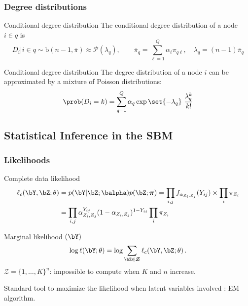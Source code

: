 \documentclass{beamer}\usepackage[]{graphicx}\usepackage[]{color}
\begin{document}
\begin{frame}
  \frametitle{Degree distributions}

  \begin{block}{Conditional degree distribution}
    The conditional degree distribution of a node $i\in q$ is
    \begin{equation*}
      D_i | i \in q \sim \mathrm{b}(n-1,\bar\pi) \approx \mathcal{P}(\lambda_q), \qquad \bar\pi_q = \sum_{\ell=1}^Q \alpha_\ell \pi_{q\ell}, \quad \lambda_q = (n-1)\bar\pi_q
    \end{equation*}
  \end{block}

  \vfill

  \begin{block}{Conditional degree distribution}
    The degree distribution of a node $i$ can be approximated by a mixture of Poisson distributions:
    \begin{equation*}
      \prob(D_i = k) = \sum_{q=1}^Q\alpha_q \exp{\set{-\lambda_q}} \ \frac{\lambda_q^k}{k !}
    \end{equation*}
  \end{block}

\end{frame}

\subsection{Statistical Inference in the SBM}

\begin{frame}
  \frametitle{Likelihoods}

\begin{block}{Complete data likelihood}
\vspace{-.5cm}
 \begin{align*}
\ell_c(\bY,\bZ; \theta)  & =  p(\bY | \bZ; \balpha) p(\bZ ; \boldsymbol\pi)\nonumber = \prod_{i,j} f_{\alpha_{Z_i,Z_j}}(Y_{ij}) \times   \prod_{i} \pi_{Z_i} \nonumber  \\
&=  \prod_{i,j} \alpha_{Z_i,Z_j}^{Y_{ij}} (1-  \alpha_{Z_i,Z_j})^{1- Y_{ij}}    \prod_{i} \pi_{Z_i} \nonumber
\end{align*}
 \end{block}
 
\begin{block}{Marginal likelihood $(\bY)$}
\vspace{-.5cm}
\begin{equation*}
\log \ell(\bY; \theta) =\log \sum_{\bZ \in \boldsymbol{\mathcal{Z}}} \ell_c(\bY,\bZ; \theta) \,.
\end{equation*}
$\boldsymbol{\mathcal{Z}} =   \{1,\dots, K\}^{n}$: impossible to compute  when  $K$ and $n$ increase. 
\end{block}

\vfill

\alert{Standard tool to maximize the likelihood when latent variables involved} : EM  algorithm.  
 
 \end{frame}
\end{document}
